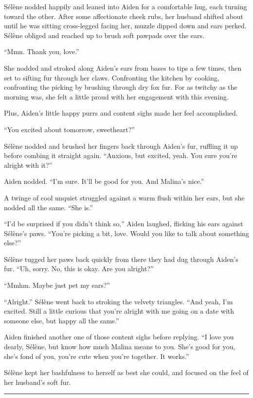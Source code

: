 Sélène nodded happily and leaned into Aiden for a comfortable hug, each turning toward the other. After some affectionate cheek rubs, her husband shifted about until he was sitting cross-legged facing her, muzzle dipped down and ears perked. Sélène obliged and reached up to brush soft pawpads over the ears.

``Mmn. Thank you, love.''

She nodded and stroked along Aiden's ears from bases to tips a few times, then set to sifting fur through her claws. Confronting the kitchen by cooking, confronting the picking by brushing through dry fox fur. For as twitchy as the morning was, she felt a little proud with her engagement with this evening.

Plus, Aiden's little happy purrs and content sighs made her feel accomplished.

``You excited about tomorrow, sweetheart?''

Sélène nodded and brushed her fingers back through Aiden's fur, ruffling it up before combing it straight again. ``Anxious, but excited, yeah. You sure you're alright with it?''

Aiden nodded. ``I'm sure. It'll be good for you. And Malina's nice.''

A twinge of cool unquiet struggled against a warm flush within her ears, but she nodded all the same. ``She is.''

``I'd be surprised if you didn't think so,'' Aiden laughed, flicking his ears against Sélène's paws. ``You're picking a bit, love. Would you like to talk about something else?''

Sélène tugged her paws back quickly from there they had dug through Aiden's fur. ``Uh, sorry. No, this is okay. Are you alright?''

``Mmhm. Maybe just pet my ears?''

``Alright.'' Sélène went back to stroking the velvety triangles. ``And yeah, I'm excited. Still a little curious that you're alright with me going on a date with someone else, but happy all the same.''

Aiden finished another one of those content sighs before replying. ``I love you dearly, Sélène, but know how much Malina means to you. She's good for you, she's fond of you, you're cute when you're together. It works.''

Sélène kept her bashfulness to herself as best she could, and focused on the feel of her husband's soft fur.

\begin{center}\rule{0.5\linewidth}{\linethickness}\end{center}

